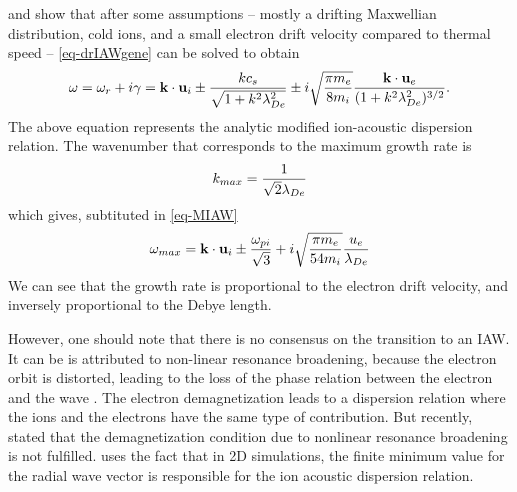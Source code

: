     \citet{lafleur2016} and \citet{janhunen2018} show that after some assumptions -- mostly a drifting Maxwellian distribution, cold ions, and a small electron drift velocity compared to thermal speed -- \cref{eq-drIAWgene} can be solved to obtain
    \begin{equation} \label{eq-MIAW}
      \omega = \omega_r + i \gamma = {\mathbf k} \cdot {\mathbf u_{i}} \pm \frac{k c_s}{\sqrt{1 + k^2 \lambda_{De}^2}} \pm i \sqrt{\frac{\pi m_e}{8 m_i}} \frac{{\mathbf k} \cdot {\mathbf u_{e}}}{( 1 + k^2 \lambda_{De}^2)^{3/2}}.
    \end{equation}
    The above equation represents the analytic modified ion-acoustic dispersion relation.
    The wavenumber that corresponds to the maximum growth rate is \citep{lafleur2016}
    \begin{equation} \label{eq-mostk}
      k_{max} = \frac{1}{\sqrt{2} \lambda_{De}}
    \end{equation}
    which gives, subtituted in \cref{eq-MIAW}
    \begin{equation} \label{eq-mostw}
      \omega_{max} =  {\mathbf k} \cdot {\mathbf u_{i}} \pm \frac{\omega_{pi}}{\sqrt{3}} + i \sqrt{ \frac{\pi m_e}{54 m_i}}\frac{u_e}{\lambda_{De}}
    \end{equation}
    We can see that the growth rate is proportional to the electron drift velocity, and inversely proportional to the Debye length.
    
    However, one should note that there is no consensus on the transition to an \ac{IAW}.
    It can be is attributed to non-linear resonance broadening, because the electron orbit is distorted, leading to the loss of the phase relation between the electron and the wave \citep{taccogna2019}.
    The electron demagnetization leads to a dispersion relation where the ions and the electrons have the same type of contribution.
    But recently, \citet{janhunen2018a} stated that the demagnetization condition due to nonlinear resonance broadening is not fulfilled.
    \citet{lafleur2017a} uses the fact that in \ac{2D} simulations, the finite minimum value for the radial wave vector is responsible for the ion acoustic dispersion relation.
    
    